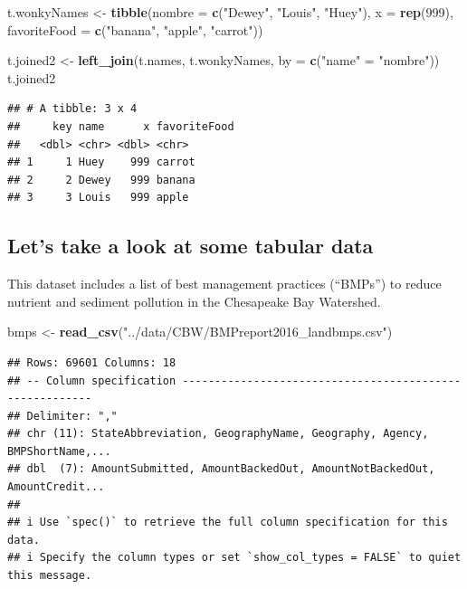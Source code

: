 \documentclass[]{article}
\newenvironment{Shaded}{\begin{snugshade}}{\end{snugshade}}
\newcommand{\AttributeTok}[1]{\textcolor[rgb]{0.13,0.29,0.53}{#1}}
\newcommand{\DecValTok}[1]{\textcolor[rgb]{0.00,0.00,0.81}{#1}}
\newcommand{\FunctionTok}[1]{\textcolor[rgb]{0.13,0.29,0.53}{\textbf{#1}}}
\newcommand{\NormalTok}[1]{#1}
\newcommand{\OtherTok}[1]{\textcolor[rgb]{0.56,0.35,0.01}{#1}}
\newcommand{\StringTok}[1]{\textcolor[rgb]{0.31,0.60,0.02}{#1}}
\begin{document}
\begin{Shaded}
\begin{Highlighting}[]
\NormalTok{t.wonkyNames }\OtherTok{\textless{}{-}} \FunctionTok{tibble}\NormalTok{(}\AttributeTok{nombre =} \FunctionTok{c}\NormalTok{(}\StringTok{"Dewey"}\NormalTok{, }\StringTok{"Louis"}\NormalTok{, }\StringTok{"Huey"}\NormalTok{),}
                       \AttributeTok{x =} \FunctionTok{rep}\NormalTok{(}\DecValTok{999}\NormalTok{),}
                       \AttributeTok{favoriteFood =} \FunctionTok{c}\NormalTok{(}\StringTok{"banana"}\NormalTok{, }\StringTok{"apple"}\NormalTok{, }\StringTok{"carrot"}\NormalTok{))}

\NormalTok{t.joined2 }\OtherTok{\textless{}{-}} \FunctionTok{left\_join}\NormalTok{(t.names, t.wonkyNames, }\AttributeTok{by =} \FunctionTok{c}\NormalTok{(}\StringTok{"name"} \OtherTok{=} \StringTok{"nombre"}\NormalTok{))}
\NormalTok{t.joined2}
\end{Highlighting}
\end{Shaded}

\begin{verbatim}
## # A tibble: 3 x 4
##     key name      x favoriteFood
##   <dbl> <chr> <dbl> <chr>       
## 1     1 Huey    999 carrot      
## 2     2 Dewey   999 banana      
## 3     3 Louis   999 apple
\end{verbatim}

\subsection{Let's take a look at some tabular
data}\label{lets-take-a-look-at-some-tabular-data}

This dataset includes a list of best management practices (``BMPs'') to
reduce nutrient and sediment pollution in the Chesapeake Bay Watershed.

\begin{Shaded}
\begin{Highlighting}[]
\NormalTok{bmps }\OtherTok{\textless{}{-}} \FunctionTok{read\_csv}\NormalTok{(}\StringTok{"../data/CBW/BMPreport2016\_landbmps.csv"}\NormalTok{)}
\end{Highlighting}
\end{Shaded}

\begin{verbatim}
## Rows: 69601 Columns: 18
## -- Column specification --------------------------------------------------------
## Delimiter: ","
## chr (11): StateAbbreviation, GeographyName, Geography, Agency, BMPShortName,...
## dbl  (7): AmountSubmitted, AmountBackedOut, AmountNotBackedOut, AmountCredit...
## 
## i Use `spec()` to retrieve the full column specification for this data.
## i Specify the column types or set `show_col_types = FALSE` to quiet this message.
\end{verbatim}
\end{document}
